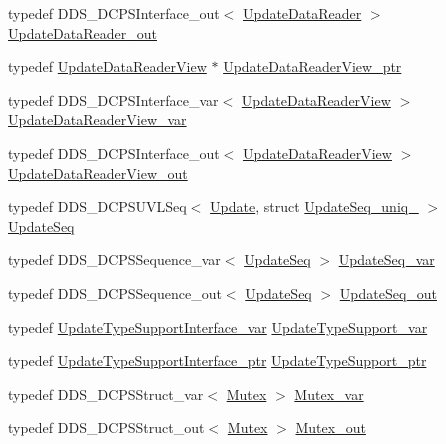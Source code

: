 \begin{DoxyCompactItemize}
\item 
typedef DDS\_\-DCPSInterface\_\-out$<$ \hyperlink{classKnowledge_1_1UpdateDataReader}{UpdateDataReader} $>$ \hyperlink{namespaceKnowledge_a870e10104a88ced8aab4b5a2919cce46}{UpdateDataReader\_\-out}
\item 
typedef \hyperlink{classKnowledge_1_1UpdateDataReaderView}{UpdateDataReaderView} $\ast$ \hyperlink{namespaceKnowledge_af5ef7684556c57687dcb741089bb32ec}{UpdateDataReaderView\_\-ptr}
\item 
typedef DDS\_\-DCPSInterface\_\-var$<$ \hyperlink{classKnowledge_1_1UpdateDataReaderView}{UpdateDataReaderView} $>$ \hyperlink{namespaceKnowledge_ad97d086c37b8c4370a3dbd0fa1f4b86a}{UpdateDataReaderView\_\-var}
\item 
typedef DDS\_\-DCPSInterface\_\-out$<$ \hyperlink{classKnowledge_1_1UpdateDataReaderView}{UpdateDataReaderView} $>$ \hyperlink{namespaceKnowledge_a75c22166ceaacc184d9853ba3dfbff04}{UpdateDataReaderView\_\-out}
\item 
typedef DDS\_\-DCPSUVLSeq$<$ \hyperlink{structKnowledge_1_1Update}{Update}, struct \hyperlink{structKnowledge_1_1UpdateSeq__uniq__}{UpdateSeq\_\-uniq\_\-} $>$ \hyperlink{namespaceKnowledge_ab62e46316b954f0d249e0e45de7059dc}{UpdateSeq}
\item 
typedef DDS\_\-DCPSSequence\_\-var$<$ \hyperlink{namespaceKnowledge_ab62e46316b954f0d249e0e45de7059dc}{UpdateSeq} $>$ \hyperlink{namespaceKnowledge_ac26f4776a7d67bf550ee0060d73af10e}{UpdateSeq\_\-var}
\item 
typedef DDS\_\-DCPSSequence\_\-out$<$ \hyperlink{namespaceKnowledge_ab62e46316b954f0d249e0e45de7059dc}{UpdateSeq} $>$ \hyperlink{namespaceKnowledge_a5967b9415eaff0e75480d8e27d0e7d41}{UpdateSeq\_\-out}
\item 
typedef \hyperlink{namespaceKnowledge_a933872871f686a514362b32892d09283}{UpdateTypeSupportInterface\_\-var} \hyperlink{namespaceKnowledge_a1f1a36d64a7bddcb9a53e10f9c6e2ac1}{UpdateTypeSupport\_\-var}
\item 
typedef \hyperlink{classKnowledge_1_1UpdateTypeSupportInterface}{UpdateTypeSupportInterface\_\-ptr} \hyperlink{namespaceKnowledge_a35ecd612e6e13cf9fe0df76dfaabf4c5}{UpdateTypeSupport\_\-ptr}
\item 
typedef DDS\_\-DCPSStruct\_\-var$<$ \hyperlink{structKnowledge_1_1Mutex}{Mutex} $>$ \hyperlink{namespaceKnowledge_a72facb8019d712476fda564e4250fd7d}{Mutex\_\-var}
\item 
typedef DDS\_\-DCPSStruct\_\-out$<$ \hyperlink{structKnowledge_1_1Mutex}{Mutex} $>$ \hyperlink{namespaceKnowledge_a606af024913884d85f7eaf14a8d40a12}{Mutex\_\-out}

\end{DoxyCompactItemize}
